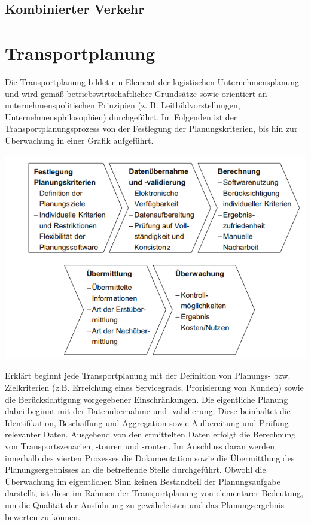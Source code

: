 \documentclass[a4paper,12pt]{scrreprt}
\begin{document}
	\section{Kombinierter Verkehr}
	
	
	\chapter{Transportplanung}
	
	Die Transportplanung bildet ein Element der logistischen Unternehmensplanung und wird gemäß betriebswirtschaftlicher Grundsätze sowie orientiert an unternehmenspolitischen Prinzipien (z. B. Leitbildvorstellungen, Unternehmensphilosophien) durchgeführt. Im Folgenden ist der Transportplanungsprozess von der Festlegung der Planungskriterien, bis hin zur Überwachung in einer Grafik aufgeführt.
	\begin{center}
	\includegraphics[width=0.7\linewidth]{./Bilder/Transportplanungsprozess}
	\end{center}
	Erklärt beginnt jede Transportplanung mit der Definition von Planungs- bzw. Zielkriterien (z.B. Erreichung eines Servicegrads, Prorisierung von Kunden) sowie die Berücksichtigung vorgegebener Einschränkungen. Die eigentliche Planung dabei beginnt mit der Datenübernahme und -validierung. Diese beinhaltet die Identifikation, Beschaffung und Aggregation sowie Aufbereitung und Prüfung relevanter Daten. Ausgehend von den ermittelten Daten erfolgt die Berechnung von Transportszenarien, -touren und -routen. Im Anschluss daran werden innerhalb des vierten Prozesses die Dokumentation sowie die Übermittlung des Planungsergebnisses an die betreffende Stelle durchgeführt. Obwohl die Überwachung im eigentlichen Sinn keinen Bestandteil der Planungsaufgabe darstellt, ist diese im Rahmen der Transportplanung von elementarer Bedeutung, um die Qualität der Ausführung zu gewährleisten und das Planungsergebnis bewerten zu können.\\
	
\end{document}
